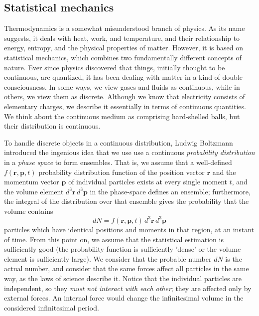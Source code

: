 \subsection{Statistical mechanics\label{sec:Physics-Statistical}}

Thermodynamics is a somewhat misunderstood branch of physics. As its name suggests, it deals with heat, work, and temperature, and their relationship to energy, entropy, and the physical properties of matter.
However, it is based on statistical mechanics, which combines two fundamentally different concepts of nature.
Ever since physics discovered that things, initially thought to be continuous, are quantized, it has been dealing with matter in a kind of double consciousness. In some ways, we view gases and fluids as continuous, while in others, we view them as discrete.
Although we know that electricity consists of elementary charges, we describe it essentially in terms of continuous quantities. We think about the continuous medium as comprising hard-shelled balls, but their distribution is continuous.

To handle discrete objects in a continuous distribution, Ludwig Boltzmann introduced the ingenious idea that
we use use a continuous \textit{probability distribution} in a \textit{phase space} to form ensembles. That is,
we assume that a well-defined  $f(\mathbf{r},\mathbf{p},t)$
probability distribution function of the position vector $\mathbf{r}$ and the momentum vector $\mathbf{p}$ of individual particles exists at every single moment $t$, and the volume element $d^3\mathbf{r}\,d^3\mathbf{p}$ in the phase-space defines an ensemble; furthermore, the integral of the distribution over that ensemble gives the probability that the volume contains
\begin{equation}
	dN=f(\mathbf{r},\mathbf{p},t)\,d^3\mathbf{r}\,d^3\mathbf{p}\label{eq:Boltzmann}
\end{equation}
particles which have identical positions and moments in that region, at an instant of time. From this point on, we assume that the statistical estimation is sufficiently good (the probability function is sufficiently 'dense' or the volume element is sufficiently large).
We consider that the probable number $dN$ is the actual  number, and 
consider that the same forces affect all particles in the same way,
as the laws of science describe it. Notice that the individual particles are independent, so they \textit{must not interact with each other};
they are affected only by external forces. 
An internal force would change the infinitesimal volume
in the considered infinitesimal period.


